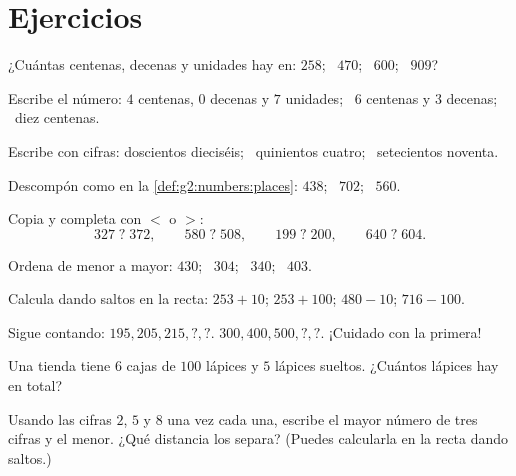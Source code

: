 \section{Ejercicios}

\begin{exercise}[$\star$]\label{exo:g2:numbers:1}
¿Cuántas centenas, decenas y unidades hay en: $258$; \ $470$; \ $600$; \
$909$?
\end{exercise}

\begin{exercise}[$\star$]\label{exo:g2:numbers:2}
Escribe el número: $4$ centenas, $0$ decenas y $7$ unidades; \ $6$ centenas
y $3$ decenas; \ diez centenas.
\end{exercise}

\begin{exercise}[$\star$]\label{exo:g2:numbers:3}
Escribe con cifras: doscientos dieciséis; \ quinientos cuatro; \
setecientos noventa.
\end{exercise}

\begin{exercise}[$\star$]\label{exo:g2:numbers:4}
Descompón como en la \cref{def:g2:numbers:places}: $438$; \ $702$; \
$560$.
\end{exercise}

\begin{exercise}[$\star$]\label{exo:g2:numbers:5}
Copia y completa con $<$ o $>$:
\[
327 \;?\; 372, \qquad
580 \;?\; 508, \qquad
199 \;?\; 200, \qquad
640 \;?\; 604 .
\]
\end{exercise}

\begin{exercise}[$\star$]\label{exo:g2:numbers:6}
Ordena de menor a mayor: $430$; \ $304$; \ $340$; \ $403$.
\end{exercise}

\begin{exercise}[$\star$]\label{exo:g2:numbers:7}
Calcula dando saltos en la recta: $253 + 10$; \quad $253 + 100$;
\quad $480 - 10$; \quad $716 - 100$.
\end{exercise}

\begin{exercise}[$\star$]\label{exo:g2:numbers:8}
Sigue contando: $195, 205, 215, ?, ?$. \quad
$300, 400, 500, ?, ?$. \quad ¡Cuidado con la primera!
\end{exercise}

\begin{exercise}[$\star$]\label{exo:g2:numbers:9}
Una tienda tiene $6$ cajas de $100$ lápices y $5$ lápices sueltos. ¿Cuántos
lápices hay en total?
\end{exercise}

\begin{exercise}[$\star\star$]\label{exo:g2:numbers:10}
Usando las cifras $2$, $5$ y $8$ una vez cada una, escribe el mayor
número de tres cifras y el menor. ¿Qué distancia los separa?
(Puedes calcularla en la recta dando saltos.)
\end{exercise}

